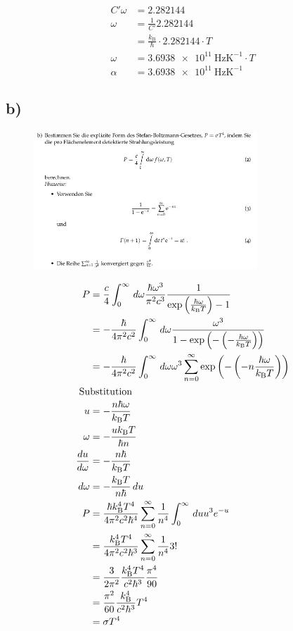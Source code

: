 \begin{align*}
    C' \omega &= 2.282144\\
    \omega &= \frac{1}{C'} 2.282144\\
     &= \frac{k_{\text{B}}}{\hbar}\cdot 2.282144\cdot T\\
    \omega &= \SI{3,6938e11}{\hertz\kelvin\tothe{-1}}\cdot T\\
    \alpha &= \SI{3,6938e11}{\hertz\kelvin\tothe{-1}}
\end{align*}

\subsection{b)}

\begin{figure}[H]
    \centering
    \includegraphics[width=0.75\textwidth]{images/Aufgabe_1b.jpg}
    \label{fig:3}
\end{figure}

\begin{align}
    P &= \frac{c}{4} \int_0^{\infty} \, d \omega \frac{\hbar \omega ^3}{\pi ^2c^3} \frac{1}{\exp\left(\frac{\hbar \omega}{k_{\text{B}}T}\right)-1}\\
    &= \--\frac{\hbar}{4 \pi ^2 c^2} \int_0^ {\infty} \, d \omega \frac{\omega ^3}{1-\exp \left(\-- \left(\--\frac{\hbar \omega}{k_{\text{B}}T} \right)\right)}\\
    &= \-- \frac{\hbar}{4\pi ^2 c^2} \int_0^ {\infty} \, d \omega \omega ^3 \sum_{n=0}^{\infty} \exp\left(\--\left(\--n\frac{\hbar \omega}{k_{\text{B}}T}\right)\right)\\
    \intertext{
        Substitution
    }
    u &= \--\frac{n \hbar \omega}{k_{\text{B}}T}\\
    \omega &= \--\frac{u k_{\text{B}}T}{\hbar n}\\
    \frac{du}{d \omega}&= \--\frac{n \hbar}{k_{\text{B}}T}\\
    d \omega &= \--\frac{k_{\text{B}}T}{n \hbar} \,d u\\
    P&= \frac{\hbar k_{\text{B}}^4 T^4}{4 \pi ^2 c^2 \hbar ^4} \sum_{n=0}^ {\infty} \frac{1}{n^4}\int_0^{\infty} \, du u^3 e^ {-u}\\
    &= \frac{ k_{\text{B}}^4 T^4}{4 \pi ^2 c^2 \hbar ^3} \sum_{n=0}^ {\infty} \frac{1}{n^4} 3!\\
    &= \frac{3}{2 \pi ^2}\frac{ k_{\text{B}}^4 T^4}{ c^2 \hbar ^3} \frac{\pi ^4}{90}\\
    &= \frac{\pi ^2}{60} \frac{ k_{\text{B}}^4}{ c^2 \hbar ^3} T^4 \\
    &= \sigma T^4
\end{align}

